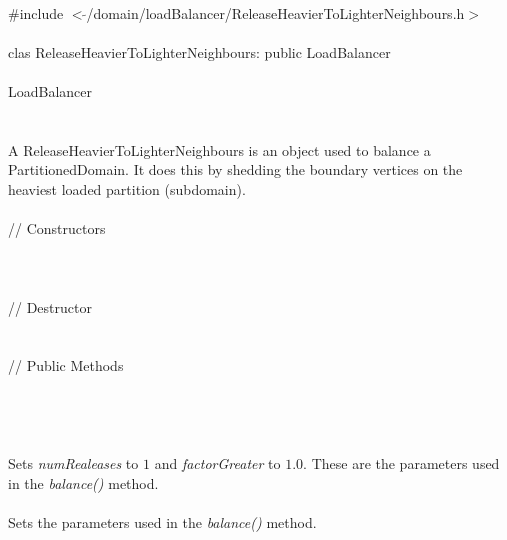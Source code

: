 
   \\
\indent \#include $<\tilde{
}$/domain/loadBalancer/ReleaseHeavierToLighterNeighbours.h$>$  \\ 

  \\
\indent clas ReleaseHeavierToLighterNeighbours: public LoadBalancer \\

 \\
\indent  LoadBalancer \\
\indent{} \\


  \\
\indent A ReleaseHeavierToLighterNeighbours is an object used to balance a
PartitionedDomain. It does this by shedding the boundary vertices on
the heaviest loaded partition (subdomain). \\

  \\
\indent\indent  // Constructors  \\
\indent{}\\ 
\indent{} \\ \\ 
\indent\indent // Destructor  \\
\indent{}\\\\
\indent\indent // Public Methods  \\
\indent{} \\ \\


\\
\\ 
Sets {\em numRealeases} to $1$ and {\em factorGreater} to $1.0$. These
are the parameters used in the {\em balance()} method. \\

 \\ 
Sets the parameters used in the {\em balance()} method. \\

